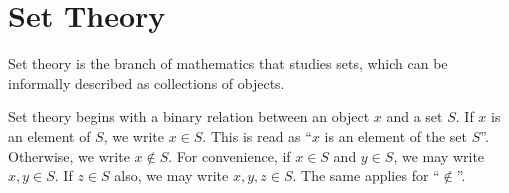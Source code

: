 

\newcommand{\version}{0.8}
\newcommand{\volumenumber}{0}
\newcommand{\volumename}{Prerequisites}
\newcommand{\volumeimage}{cover/Venn Diagram.png}

\linespread{1.05}

\renewcommand{\thetheorem}{\arabic{part}.\arabic{chapter}.\arabic{section}.\arabic{theorem}}
\renewcommand{\theexercisehidden}{\arabic{part}.\arabic{chapter}.\arabic{exercisehidden}}
\renewcommand{\theproblem}{\arabic{part}.\arabic{chapter}.\arabic{problem}}

\newcommand{\quotepagetext}{
    Aus dem Paradies, das Cantor uns geschaffen, soll uns niemand vertreiben k\"{o}nnen.\\
    (\textit{No one shall expel us from the Paradise that Cantor has created.})
}
\newcommand{\quotepageattribution}{David Hilbert, 1926}
\newcommand{\quotepagecitation}{\cite[p.~170]{hilbert_1926}}

\newcommand{\prefacevolumetext}{
    This volume, in particular, provides the necessary prerequisites to engage with the subject material. We cover basic set theory, functions/mappings, mathematical logic and proof writing, elementary number theory, and simple modular arithmetic here, allowing one to have sufficient knowledge to understand the subject material in the other volumes.
}

\newcommand{\interdependencenotes}{
}


\frontmatterpages

\chapter{Set Theory}
Set theory is the branch of mathematics that studies sets, which can be informally described as collections of objects.

Set theory begins with a binary relation between an object $x$ and a set $S$. If $x$ is an element of $S$, we write $x \in S$. This is read as ``$x$ is an element of the set $S$''. Otherwise, we write $x \notin S$. For convenience, if $x \in S$ and $y \in S$, we may write $x, y \in S$. If $z \in S$ also, we may write $x, y, z \in S$. The same applies for ``$\notin$''.

